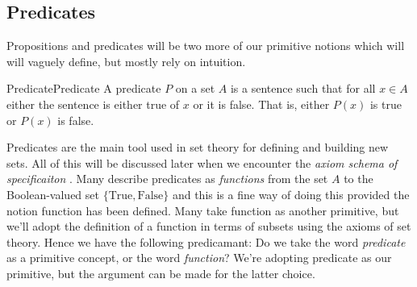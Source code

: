     \subsection{Predicates}
        Propositions and predicates will be two more of our primitive notions
        which will will vaguely define, but mostly rely on intuition.
        \begin{fdefinition}{Predicate}{Predicate}
            A predicate $P$ on a \gls{set} $A$ is a sentence such that for all
            $x\in{A}$ either the sentence is either true of $x$ or it is false.
            That is, either $P(x)$ is true or $P(x)$ is false.
        \end{fdefinition}
        Predicates are the main tool used in set theory for defining and
        building new sets. All of this will be discussed later when we
        encounter the \textit{axiom schema of specificaiton}%
        . Many describe predicates as
        \textit{functions} from the set $A$ to the Boolean-valued set
        $\{\text{True},\text{False}\}$ and this is a fine way of doing this
        provided the notion function has been defined. Many take function as
        another primitive, but we'll adopt the definition of a function in terms
        of subsets using the axioms of set theory. Hence we have the following
        predicamant: Do we take the word \textit{predicate} as a primitive
        concept, or the word \textit{function}? We're adopting predicate as our
        primitive, but the argument can be made for the latter choice.
